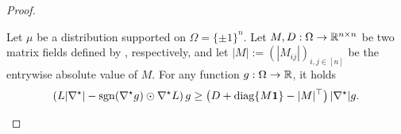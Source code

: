 \begin{proof}
    \begin{lemma}
    \label{lem:abs-commutator}
        Let $\mu$ be a distribution supported on $\Omega = \{\pm 1\}^n$.
        Let $M,D: \Omega \to \mathbb{R}^{n \times n}$ be two matrix fields defined by , respectively, and let $|M| := (|M_{ij}|)_{i,j \in [n]}$ be the entrywise absolute value of $M$.
        For any function $g: \Omega \to \mathbb{R}$, it holds
        \begin{align*}
            \left( L |\nabla^\star| - \mathrm{sgn}(\nabla^\star g) \odot \nabla^\star L \right) g \ge \left( D + \mathrm{diag}\{M\boldsymbol{1}\} - |M|^\top \right) |\nabla^\star| g.
        \end{align*}
    \end{lemma}
    

\end{proof}

